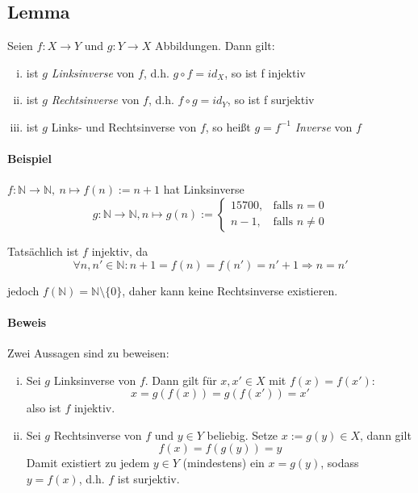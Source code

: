 \subsection*{Lemma}
	\begin{Lemma}[Inverse]
		Seien $ f:X\to Y $ und $ g:Y\to X $ Abbildungen. Dann gilt:
	\begin{enumerate}[i)]
		\item ist $ g $ \emph{Linksinverse} von $ f $, d.h. $ g\circ f = id_X $, so ist f injektiv
		\item ist $ g $ \emph{Rechtsinverse} von $ f $, d.h. $ f\circ g = id_Y$, so ist f surjektiv
		\item ist $ g $ Links- und Rechtsinverse von $ f $, so heißt $ g =f^{-1}$ \emph{Inverse} von $ f $
	\end{enumerate}
	\end{Lemma}

\paragraph{Beispiel}
	$ f:\mathbb{N}\to \mathbb{N},\ n\mapsto f(n):= n+1 $ hat Linksinverse
	\begin{equation*}
		g:\mathbb{N} \to \mathbb{N}, n\mapsto g(n):=
		\begin{cases}
			15700, & \text{falls } n=0\\
			n-1, & \text{falls } n\neq 0
		\end{cases}
	\end{equation*}

	Tatsächlich ist $ f $ injektiv, da
	\begin{equation*}
		\forall n,n'\in \mathbb{N} : n+1 = f(n) = f(n') = n'+1 \Rightarrow n=n'
	\end{equation*}
	
	jedoch $ f(\mathbb{N}) = \mathbb{N}\setminus \{0\} $, daher kann keine Rechtsinverse existieren.

\paragraph{Beweis}
	Zwei Aussagen sind zu beweisen:
	\begin{enumerate}[i)]
		\item Sei $ g $ Linksinverse von $ f $. Dann gilt für $ x,x'\in X $ mit $ f(x) = f(x')$:
                \[x = g(f(x)) = g(f(x')) = x'\]
                also ist $ f $ injektiv.
		\item Sei $g $ Rechtsinverse von $ f $ und $ y\in Y $ beliebig. Setze $ x:= g(y)\in X $, dann gilt 
		\[f(x) = f(g(y)) = y\]
		Damit existiert zu jedem $ y\in Y $ (mindestens) ein $ x = g(y) $, sodass  $ y=f(x) $, d.h. $f$ ist surjektiv.
	\end{enumerate}

